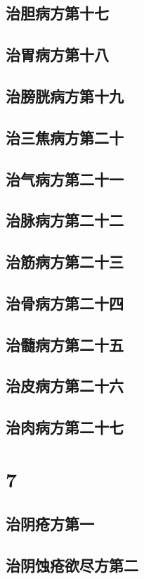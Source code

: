 \documentclass[a4paper,12pt,UTF8,twoside]{ctexbook}
\begin{document}
\chapter{治胆病方第十七}
\chapter{治胃病方第十八}
\chapter{治膀胱病方第十九}
\chapter{治三焦病方第二十}
\chapter{治气病方第二十一}
\chapter{治脉病方第二十二}
\chapter{治筋病方第二十三}
\chapter{治骨病方第二十四}
\chapter{治髓病方第二十五}
\chapter{治皮病方第二十六}
\chapter{治肉病方第二十七}

\part{7}
\chapter{治阴疮方第一}
\chapter{治阴蚀疮欲尽方第二}
\end{document}
